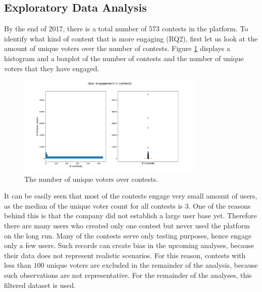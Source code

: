 \subsection{Exploratory Data Analysis}
    By the end of 2017, there is a total number of 573 contests in the platform. To identify what kind of content that is more engaging (RQ2), first let us look at the amount of unique voters over the number of contests. Figure \ref{user_engagement_in_contests} displays a histogram and a boxplot of the number of contests and the number of unique voters that they have engaged. 
    
    \begin{figure}[h] 
        \begin{center}
            \includegraphics[width=0.8\textwidth]{Images/user_engagement_in_contests.png}
            \caption{The number of unique voters over contests.}
            \label{user_engagement_in_contests}
        \end{center}
    \end{figure}

    It can be easily seen that most of the contests engage very small amount of users, as the median of the unique voter count for all contests is 3. One of the reasons behind this is that the company did not establish a large user base yet. Therefore there are many users who created only one contest but never used the platform on the long run. Many of the contests serve only testing purposes, hence engage only a few users. Such records can create bias in the upcoming analyses, because their data does not represent realistic scenarios. For this reason, contests with less than $100$ unique voters are excluded in the remainder of the analysis, because such observations are not representative. For the remainder of the analyses, this filtered dataset is used.

